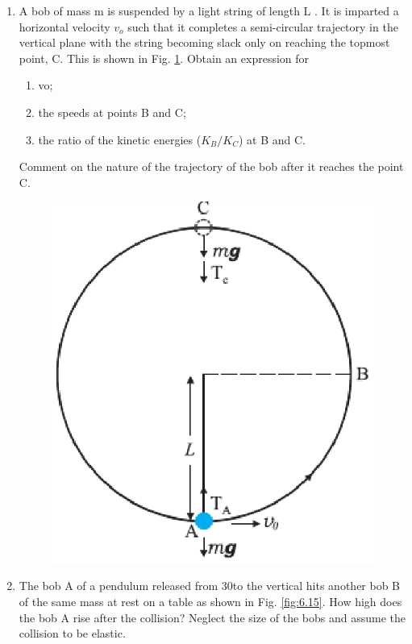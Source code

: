 \begin{enumerate}[label=\arabic*.,ref=\thesubsection.\theenumi]
\item A bob of mass m is suspended by a light string of length L . It is imparted a horizontal velocity $v_o$
such that it completes a semi-circular trajectory in the vertical plane with the string becoming slack only on reaching the topmost point, C. This is shown in Fig. \ref{fig:6.6}. Obtain an expression for 
\begin{enumerate}
\item  vo; 
\item  the speeds at points B and C; 
\item  the ratio of the kinetic energies ($K_B/K_C$) at B and C. 
\end{enumerate}
Comment on the nature
of the trajectory of the bob after it reaches the point C.
\begin{figure}[!ht]
\includegraphics[width=\columnwidth]{./figs/11-1/6/6.6.eps}
\caption{}
\label{fig:6.6}
\end{figure}
\item The bob A of a pendulum released from 30\degree to the
vertical hits another bob B of the same mass at rest on a table as shown in Fig. \ref{fig:6.15}. How high does the bob A rise after the collision? Neglect the size of the bobs and assume the collision to be elastic.

\end{enumerate}
